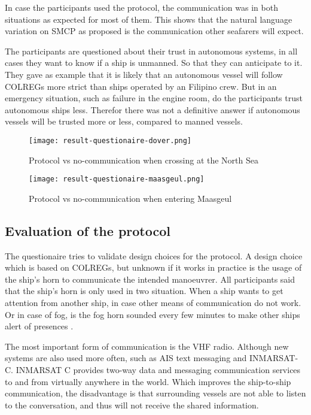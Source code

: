 In case the participants used the protocol, the communication was in both situations as expected for most of them. This shows that the natural language variation on \ac{SMCP} as proposed is the communication other seafarers will expect.

The participants are questioned about their trust in autonomous systems, in all cases they want to know if a ship is unmanned. So that they can anticipate to it. They gave as example that it is likely that an autonomous vessel will follow COLREGs more strict than ships operated by an Filipino crew. But in an emergency situation, such as failure in the engine room, do the participants trust autonomous ships less. Therefor there was not a definitive answer if autonomous vessels will be trusted more or less, compared to manned vessels.

\begin{figure}[p]
	\centering
	\texttt{[image: result-questionaire-dover.png]}
	\caption{Protocol vs no-communication when crossing at the North Sea}
	\label{fig:sq-dover}
\end{figure}

\begin{figure}[p]
	\centering
	\texttt{[image: result-questionaire-maasgeul.png]}
	\caption{Protocol vs no-communication when entering Maasgeul}
	\label{fig:sq-maasgeul}
\end{figure}


\subsection{Evaluation of the protocol}
The questionaire tries to validate design choices for the protocol. A design choice which is based on COLREGs, but unknown if it works in practice is the usage of the ship's horn to communicate the intended manoeuvrer. All participants said that the ship's horn is only used in two situation. When a ship wants to get attention from another ship, in case other means of communication do not work. Or in case of fog, is the fog horn sounded every few minutes to make other ships alert of presences \cite{IMO1972}.

The most important form of communication is the VHF radio. Although new systems are also used more often, such as \ac{AIS} text messaging and INMARSAT-C. INMARSAT C provides two-way data and messaging communication services to and from virtually anywhere in the world. Which improves the ship-to-ship communication, the disadvantage is that surrounding vessels are not able to listen to the conversation, and thus will not receive the shared information.


